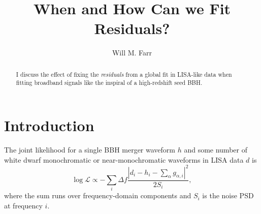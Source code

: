 \documentclass[modern]{aastex631}
\newcommand{\like}{\mathcal{L}}
\begin{document}
\title{When and How Can we Fit Residuals?}

\author[0000-0003-1540-8562]{Will M. Farr}

\begin{abstract}
    I discuss the effect of fixing the \emph{residuals} from a global fit in
    LISA-like data when fitting broadband signals like the inspiral of a
    high-redshift seed BBH.
\end{abstract}

\section{Introduction}

The joint likelihood for a single BBH merger waveform $h$ and some number of
white dwarf monochromatic or near-monochromatic waveforms in LISA data $d$ is
%
\begin{equation}
    \log \like \propto - \sum_i \Delta f \frac{\left| d_i - h_i - \sum_\alpha g_{\alpha, i} \right|^2}{2 S_i},
\end{equation}
%
where the sum runs over frequency-domain components and $S_i$ is the noise PSD
at frequency $i$.
\end{document}
